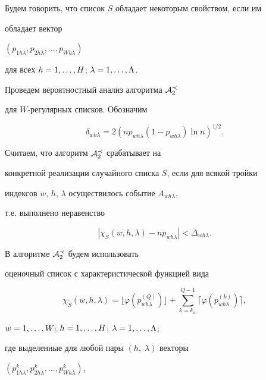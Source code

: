 Будем говорить, что список $S$ обладает некоторым свойством, если им 


обладает вектор 


$(p_{1h\lambda},p_{2h\lambda},\dotsc,p_{Wh\lambda})$ 


для всех $h=1,\dotsc,H$; $\lambda=1,\dotsc,\Lambda$.





Проведем вероятностный анализ алгоритма ${\cal A}_{2}^{\prec}$


для $W$-регулярных списков. Обозначим


$$


\delta_{wh\lambda} = 2 (n p_{wh\lambda}


(1- p_{wh\lambda}) \ln n )^{1/2}.


$$





Считаем, что алгоритм $ {\cal A}_{2}^{\prec}$ срабатывает на


конкретной реализации случайного списка $S$, если для всякой тройки


индексов $w$, $h$, $\lambda$ осуществилось событие $A_{wh\lambda}$, 


т.е. выполнено неравенство


\begin{equation}


\label{e17}


|\chi_S(w,h,\lambda)-np_{wh\lambda}| < \Delta_{wh\lambda}.


\end{equation}





В алгоритме $ {\cal A}_{2}^{\prec}$ будем использовать


оценочный список с характеристической функцией вида


$$


\chi_{\widetilde S}(w,h,\lambda) =


\lfloor \varphi (p_{wh\lambda}^{(Q)}) \rfloor +


\sum_{k=k_{w}}^{Q-1}


\lceil \varphi (p_{wh\lambda}^{(k)}) \rceil,


$$


$w=1,\dotsc,W$; $h=1,\dotsc,H$; $\lambda=1,\dotsc,\Lambda$;


где выделенные для любой пары $(h,\; \lambda)$ векторы


$(p_{1h\lambda}^k,p_{2h\lambda}^k,\dotsc,p_{Wh\lambda}^k)$,


